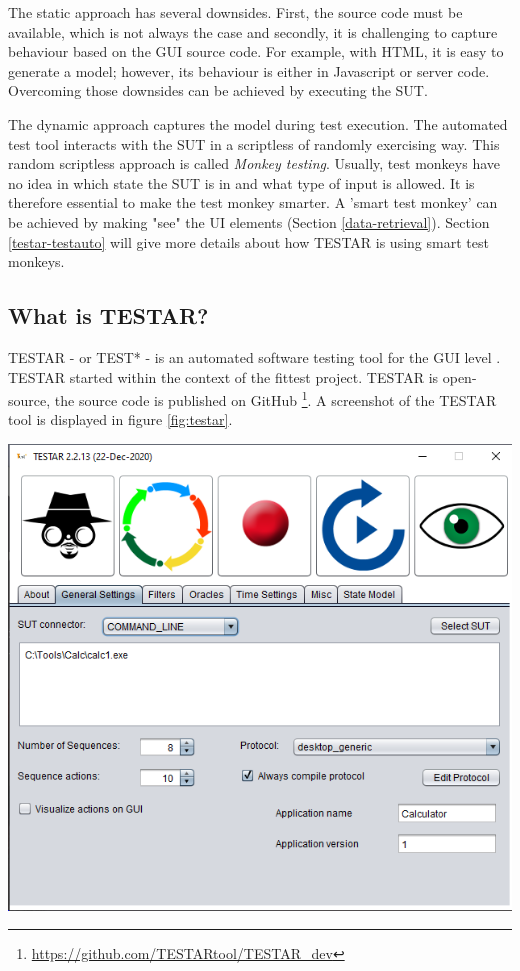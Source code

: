 The static approach has several downsides. First, the source code must be available, which is not always the case and secondly, it is challenging to capture behaviour based on the GUI source code. For example, with HTML, it is easy to generate a model; however, its behaviour is either in Javascript or server code. Overcoming those downsides can be achieved by executing the SUT. 

The dynamic approach captures the model during test execution. The automated test tool interacts with the SUT in a scriptless of randomly exercising way. This random scriptless approach is called \emph{Monkey testing}. Usually, test monkeys have no idea in which state the SUT is in and what type of input is allowed. It is therefore essential to make the test monkey smarter. A 'smart test monkey' can be achieved by making "see" the UI elements (Section \ref{data-retrieval}). Section \ref{testar-testauto} will give more details about how TESTAR is using smart test monkeys.

\subsection{What is TESTAR?} \label{what-is-testar}
TESTAR - or TEST* - is an automated software testing tool for the GUI level \cite{testar-about}. TESTAR started within the context of the \acrfull{fittest} project. TESTAR is open-source, the source code is published on GitHub \footnote{ \url{https://github.com/TESTARtool/TESTAR\_dev}}. A screenshot of the TESTAR tool is displayed in figure \ref{fig:testar}.

\begingroup
\captionsetup{type=figure}
\includegraphics[scale=0.5]{pics/testar.png}
\label{fig:testar}
\endgroup

